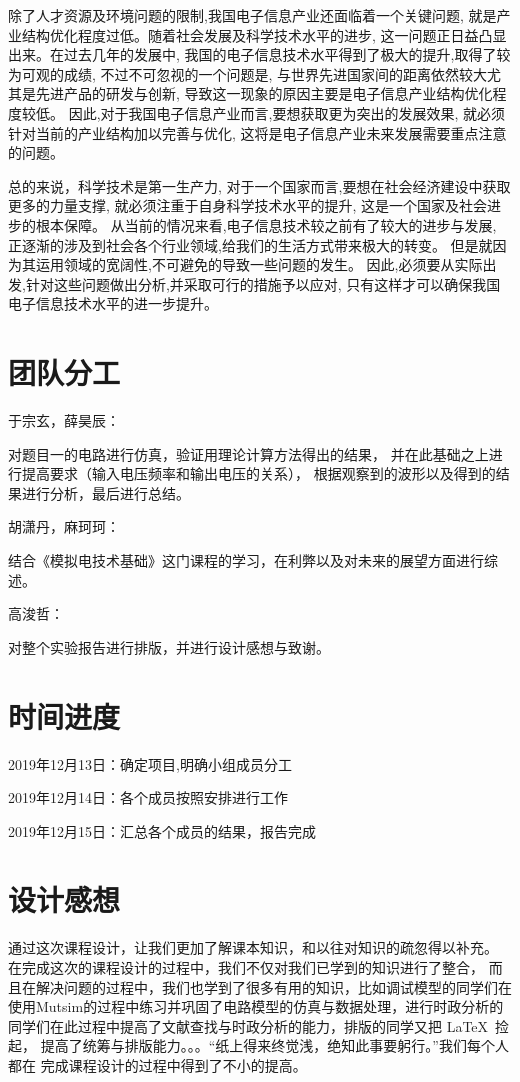 \documentclass[10pt, conference, compsocconf, a4paper]{IEEEtran}
\begin{document}
除了人才资源及环境问题的限制,我国电子信息产业还面临着一个关键问题,
就是产业结构优化程度过低。随着社会发展及科学技术水平的进步,
这一问题正日益凸显出来。在过去几年的发展中,
我国的电子信息技术水平得到了极大的提升,取得了较为可观的成绩,
不过不可忽视的一个问题是,
与世界先进国家间的距离依然较大尤其是先进产品的研发与创新,
导致这一现象的原因主要是电子信息产业结构优化程度较低。
因此,对于我国电子信息产业而言,要想获取更为突出的发展效果,
就必须针对当前的产业结构加以完善与优化,
这将是电子信息产业未来发展需要重点注意的问题。\cite{chen2014}
\par

总的来说，科学技术是第一生产力,
对于一个国家而言,要想在社会经济建设中获取更多的力量支撑,
就必须注重于自身科学技术水平的提升,
这是一个国家及社会进步的根本保障。
从当前的情况来看,电子信息技术较之前有了较大的进步与发展,
正逐渐的涉及到社会各个行业领域,给我们的生活方式带来极大的转变。
但是就因为其运用领域的宽阔性,不可避免的导致一些问题的发生。
因此,必须要从实际出发,针对这些问题做出分析,并采取可行的措施予以应对,
只有这样才可以确保我国电子信息技术水平的进一步提升。\par


\section{团队分工}

于宗玄，薛昊辰：\par
对题目一的电路进行仿真，验证用理论计算方法得出的结果，
并在此基础之上进行提高要求（输入电压频率和输出电压的关系）， 
根据观察到的波形以及得到的结果进行分析，最后进行总结。

胡潇丹，麻珂珂：\par
结合《模拟电技术基础》这门课程的学习，在利弊以及对未来的展望方面进行综述。

高浚哲：\par
对整个实验报告进行排版，并进行设计感想与致谢。


\section{时间进度}

2019年12月13日：确定项目,明确小组成员分工\par
2019年12月14日：各个成员按照安排进行工作\par
2019年12月15日：汇总各个成员的结果，报告完成\par

\section{设计感想}
通过这次课程设计，让我们更加了解课本知识，和以往对知识的疏忽得以补充。
在完成这次的课程设计的过程中，我们不仅对我们已学到的知识进行了整合，
而且在解决问题的过程中，我们也学到了很多有用的知识，比如调试模型的同学们在
使用Mutsim的过程中练习并巩固了电路模型的仿真与数据处理，进行时政分析的
同学们在此过程中提高了文献查找与时政分析的能力，排版的同学又把 \LaTeX\ 捡起，
提高了统筹与排版能力。。。“纸上得来终觉浅，绝知此事要躬行。”我们每个人都在
完成课程设计的过程中得到了不小的提高。
\end{document}
